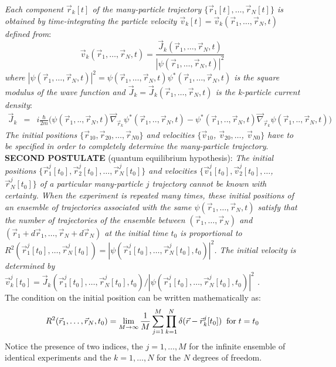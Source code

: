 \documentclass[nofootinbib, secnumarabic, amsmath, nobibnotes,10pt,aps,pra]{revtex4-1}
\begin{document}
\textit{Each component $\vec r_k[t]$ of the many-particle trajectory  $\{\vec r_1[t],\ldots,\vec r_N[t]\}$ is obtained by time-integrating the particle velocity $\vec v_k[t] = \vec v_k(\vec r_1,\ldots,\vec r_N,t)$ defined from}:
\begin{equation}
\vec v_k(\vec r_1,\ldots,\vec r_N,t) = \frac{\vec J_k(\vec r_1,\ldots,\vec r_N,t)} {|\psi(\vec r_1,\ldots,\vec r_N,t)|^2}
\nonumber
\end{equation}
\textit{where $|\psi(\vec r_1,\ldots,\vec r_N,t)|^2 = \psi(\vec
r_1,\ldots,\vec r_N,t) \psi^*(\vec r_1,\ldots,\vec r_N,t)$ is the
square modulus of the wave function and $\vec J_k = \vec J_k(\vec
r_1,\ldots,\vec r_N,t)$ is the k-particle  current density}:
\begin{eqnarray*}
\vec J_k &=& i \frac {\hbar} {2m} \Big(\psi(\vec r_1,..,\vec r_N,t) \vec \nabla_{\vec{r}_k} {\psi^{*}(\vec r_1,..,\vec r_N,t)}-\psi^{*}(\vec r_1,..,\vec r_N,t) \vec \nabla_{\vec{r}_k} \psi(\vec r_1,..,\vec r_N,t) \Big)
\end{eqnarray*}
\textit{The initial positions $\{\vec r_{10},\vec r_{20},\ldots,\vec r_{N0}\}$ and
velocities $\{\vec v_{10}$, $\vec v_{20},\ldots$, $\vec v_{N0}\}$ have to be specified in order to completely determine the many-particle trajectory}.\\

\noindent\textbf{SECOND POSTULATE} (quantum equilibrium hypothesis): \textit{The initial positions $\{\vec r^j_{1}[t_0],\vec r^j_{2}[t_0],\ldots,\vec r^j_{N}[t_0] \}$
and velocities $\{\vec v^j_{1}[t_0],\vec v^j_{2}[t_0],\ldots$, $\vec r^j_{N}[t_0]\}$ of a particular many-particle $j$ trajectory cannot be known with certainty.
When the experiment is repeated many times, these initial positions of an ensemble of trajectories associated with the same $\psi(\vec r_1,\ldots,\vec r_N,t)$ satisfy that the number of trajectories of the ensemble between $(\vec r_1,\ldots,\vec r_N)$ and $(\vec r_1 + d\vec r_1,\ldots,\vec r_N + d \vec r_N)$ at the initial time $t_0$ is proportional to $R^2(\vec r^j_{1}[t_0],\ldots,\vec r^j_{N}[t_0]) = |\psi(\vec r^j_{1}[t_0],\ldots,\vec r^j_{N}[t_0],t_0)|^2$.
The initial velocity is determined by $\vec v_k^j[t_0] = \vec J_k(\vec r^j_{1}[t_0],\ldots,\vec r^j_{N}[t_0],  t_0)/|\psi(\vec r^j_{1}[t_0],\ldots,\vec r^j_{N}[t_0],t_0)|^2$ .}\\

The condition on the initial position can be written mathematically as:
\begin{equation}
\label{om.sum_0f_particlesNDo}
R^2(\vec r_1,\ldots,\vec r_N,t_0) = \lim_{M\rightarrow\infty} \frac {1} {M} \sum_{j = 1}^{M} \prod_{k = 1}^{N}\delta(\vec r-\vec r_{k}^j[t_0])  \; \; {\rm for}\; t = t_0
\end{equation}
Notice the presence of two indices, the $j = 1,\ldots,M$ for the infinite ensemble of identical experiments and the $k = 1,\ldots,N$ for the $N$ degrees of freedom.\\
\end{document}
